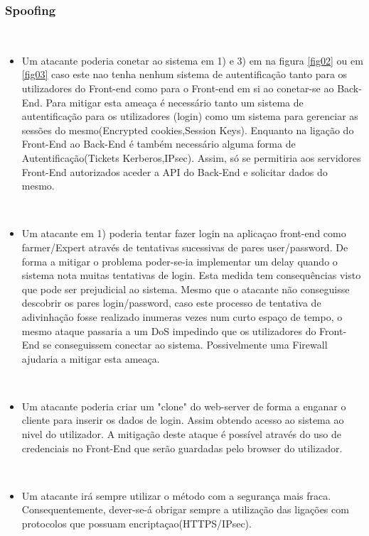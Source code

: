 \subsubsection{Spoofing}
\label{Spoofing:sec}
\hfill\\
\begin{itemize}

\item Um atacante poderia conetar ao sistema em 1) e 3) em  na figura \ref{fig02} ou em \ref{fig03} caso este nao tenha nenhum sistema de autentificação tanto para os utilizadores do Front-end como para o Front-end em si ao conetar-se ao Back-End. Para mitigar esta ameaça é necessário tanto um sistema de autentificação para os utilizadores (login) como um sistema para gerenciar as sessões do mesmo(Encrypted cookies,Session Keys). Enquanto na ligação do Front-End ao Back-End é também necessário alguma forma de Autentificação(Tickets Kerberos,IPsec). Assim, só se permitiria aos servidores Front-End autorizados aceder a API do Back-End e solicitar dados do mesmo.

\hfill\\
\item Um atacante em 1) poderia tentar fazer login na aplicaçao front-end como farmer/Expert através de tentativas sucessivas de pares user/password. De forma a mitigar o problema poder-se-ia implementar um  delay quando o sistema nota muitas tentativas de login. Esta medida tem consequências visto que pode ser prejudicial ao sistema.
 Mesmo que o atacante não conseguisse descobrir os pares login/password, caso este processo de tentativa de adivinhação fosse realizado inumeras vezes num curto espaço de tempo, o mesmo ataque passaria a um DoS impedindo que os utilizadores do Front-End se conseguissem conectar ao sistema. Possivelmente uma Firewall ajudaria a mitigar esta ameaça.


\hfill\\
\item Um atacante poderia criar um "clone" do web-server de forma a enganar o cliente para inserir os dados de login. Assim obtendo acesso ao sistema ao nivel do utilizador. A mitigação deste ataque é possível através do uso de credenciais no Front-End que serão guardadas pelo browser do utilizador. 

\hfill\\
\item Um atacante irá sempre utilizar o método com a segurança mais fraca. Consequentemente, dever-se-á obrigar sempre a utilização das ligações com protocolos que possuam encriptaçao(HTTPS/IPsec).

\end{itemize}

